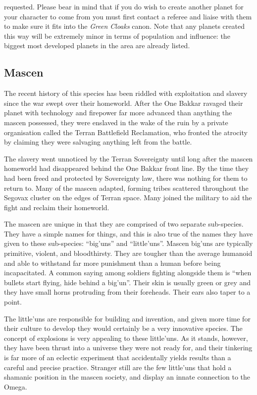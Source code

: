 \documentclass{scrbook}
\begin{document}
requested. Please bear in mind that if you do wish to create another planet for your character to come from you must first contact a referee and liaise with them to make sure it fits into the \textit{Green Cloaks} canon. Note that any planets created this way will be extremely minor in terms of population and influence: the biggest most developed planets in the area are already listed.

\subsection{Mascen}

The recent history of this species has been riddled with exploitation and slavery since the war swept over their homeworld. After the One Bakkar ravaged their planet with technology and firepower far more advanced than anything the mascen possessed, they were enslaved in the wake of the ruin by a private organisation called the Terran Battlefield Reclamation, who fronted the atrocity by claiming they were salvaging anything left from the battle.

The slavery went unnoticed by the Terran Sovereignty until long after the mascen homeworld had disappeared behind the One Bakkar front line. By the time they had been freed and protected by Sovereignty law, there was nothing for them to return to. Many of the mascen adapted, forming tribes scattered throughout the Segovax cluster on the edges of Terran space. Many joined the military to aid the fight and reclaim their homeworld.

The mascen are unique in that they are comprised of two separate sub-species. They have a simple names for things, and this is also true of the names they have given to these sub-species: ``big'uns'' and ``little'uns''. Mascen big'uns are typically primitive, violent, and bloodthirsty. They are tougher than the average humanoid and able to withstand far more punishment than a human before being incapacitated. A common saying among soldiers fighting alongside them is ``when bullets start flying, hide behind a big'un''. Their skin is usually green or grey and they have small horns protruding from their foreheads. Their ears also taper to a point.

The little'uns are responsible for building and invention, and given more time for their culture to develop they would certainly be a very innovative species. The concept of explosions is very appealing to these little'uns. As it stands, however, they have been thrust into a universe they were not ready for, and their tinkering is far more of an eclectic experiment that accidentally yields results than a careful and precise practice. Stranger still are the few little'uns that hold a shamanic position in the mascen society, and display an innate connection to the Omega.
\end{document}
